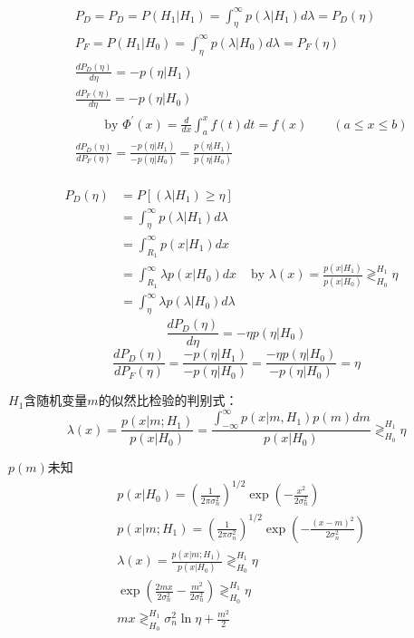 \begin{frame}
\begin{align*}
&P_D =P_D=P(H_1|H_1)=\int_{\eta}^{\infty}p(\lambda|H_1)d\lambda=P_D(\eta) \\
&P_F =P(H_1|H_0)=\int_{\eta}^{\infty}p(\lambda|H_0)d\lambda=P_F(\eta) \\
&\frac{dP_D(\eta)}{d\eta} =-p(\eta|H_1) \\ 
&\frac{dP_F(\eta)}{d\eta} =-p(\eta|H_0) \\ 
&\qquad \text{ by } \Phi^\prime(x)=\frac{d}{dx}\int_a^xf(t)dt=f(x)\qquad (a\le x\le b) \\
&\frac{dP_D(\eta)}{dP_F(\eta)} =\frac{-p(\eta|H_1)}{-p(\eta|H_0)}=\frac{p(\eta|H_1)}{p(\eta|H_0)}\\
\end{align*}
\end{frame}

\begin{frame}
\begin{align*}
P_D(\eta) &=P[(\lambda|H_1)\ge\eta]&\\
&=\int_{\eta}^{\infty}p(\lambda|H_1)d\lambda&\\
&=\int_{R_1}^{\infty}p(x|H_1)dx&\\
&=\int_{R_1}^{\infty}\lambda p(x|H_0)dx &\text{ by }\lambda(x)=\frac{p(x|H_1)}{p(x|H_0)}\mathop{\gtrless}_{H_0}^{H_1}\eta&\\
&=\int_{\eta}^{\infty}\lambda p(\lambda|H_0)d\lambda&
\end{align*}
\[\frac{dP_D(\eta)}{d\eta}=-\eta p(\eta|H_0)\]
\[\frac{dP_D(\eta)}{dP_F(\eta)}=\frac{-p(\eta|H_1)}{-p(\eta|H_0)}=\frac{-\eta p(\eta|H_0)}{-p(\eta|H_0)}=\eta \]  
\end{frame}

\begin{frame}
$H_1$含随机变量$m$的似然比检验的判别式：
\[\lambda(x)=\frac{p(x|m; H_1)}{p(x|H_0)}=\frac{\int_{-\infty}^{\infty}p(x|m,H_1)p(m)dm}{p(x|H_0)}\mathop{\gtrless}_{H_0}^{H_1}\eta \]
\end{frame}

\begin{frame}
$p(m)$未知
\begin{align*}
&p(x|H_0)=(\frac{1}{2\pi\sigma_n^2})^{1/2}\exp(-\frac{x^2}{2\sigma_n^2})\\
&p(x|m;H_1)=(\frac{1}{2\pi\sigma_n^2})^{1/2}\exp(-\frac{(x-m)^2}{2\sigma_n^2})\\
&\lambda(x)=\frac{p(x|m; H_1)}{p(x|H_0)}\mathop{\gtrless}_{H_0}^{H_1}\eta\\
&\exp(\frac{2mx}{2\sigma_n^2}-\frac{m^2}{2\sigma_n^2})\mathop{\gtrless}_{H_0}^{H_1}\eta\\
&mx\mathop{\gtrless}_{H_0}^{H_1}\sigma_n^2\ln\eta+\frac{m^2}{2}
\end{align*}
\end{frame}

